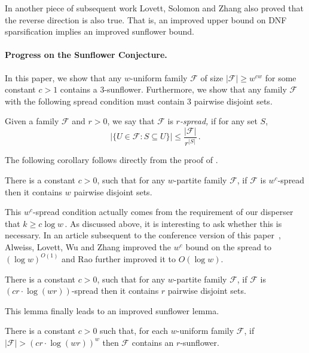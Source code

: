 \documentclass{toc}
\newcommand{\calF}{\mathcal{F}} %
\begin{document}
%
%
In another piece of subsequent work %
Lovett, Solomon and Zhang \cite{lovett2019dnf} also proved that 
the reverse direction is also true. That is, an improved upper bound
on DNF sparsification implies an improved sunflower bound.

%
%
\paragraph{Progress on the Sunflower Conjecture.}
In this paper, we show that any $w$-uniform family 
$\calF$ of size $|\calF|\geq w^{cw}$
for some constant $c>1$ contains a $3$-sunflower.
Furthermore, we show that any family 
$\calF$ with the following
spread condition must contain $3$ pairwise disjoint sets.

\begin{definition} \label{def:spread} Given a family
$\calF$ and $r>0$, we say that $\calF$ is \emph{$r$-spread,}
if for any set $S$, %
%
\[ \big|\{U\in\calF : S\subseteq U\}\big| \leq
%
\frac{\big|\calF\big|}{r^{|S|}}\,.  %
\]
\end{definition}

The following corollary follows directly from the proof of
.

\begin{corollary} There is a constant $c>0$, such that for any
%
$w$-partite
%
family   %
$\calF$, if $\calF$ is $w^{c}$-spread then it
contains $w$ pairwise disjoint sets.
\end{corollary}

This $w^{c}$-spread condition actually comes from the requirement of
our disperser that $k \geq c \log w$\,. As discussed above, it is
interesting to ask whether this is necessary.
%
%
%
In an article subsequent to the conference version
of this paper~\cite{conf-version},  %
Alweiss, Lovett, Wu and Zhang \cite{alweiss2020improved} improved
%
%
%
the $w^c$ bound on the spread %
%
to $(\log w)^{O(1)}$ and Rao \cite{rao2020coding} further
improved it to $O(\log w)$.

\begin{lemma} 
There is a constant $c>0$, such that for any
%
$w$-partite  %
family $\calF$, if $\calF$ is $(c r\cdot \log (wr))$-spread then
it contains $r$ pairwise disjoint sets.
\end{lemma}

This lemma finally leads to
an improved sunflower lemma.
%
%
%

\begin{corollary} %
There is a constant $c>0$ such that, for each
%
%
$w$-uniform family  %
%
$\calF$, if $|\calF| > (c r\cdot \log (wr))^{w}$
then $\calF$ contains an $r$-sunflower.
\end{corollary}
\end{document}
